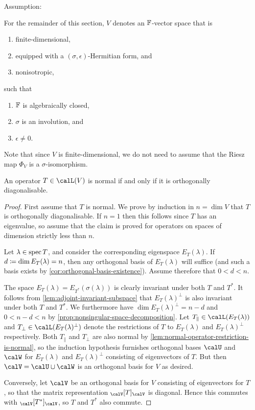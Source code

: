 Assumption:

For the remainder of this section, $V$ denotes an $\mathbb{F}$-vector space that is
%
\begin{enumerate}
    \item finite-dimensional,
    \item equipped with a $(\sigma,\epsilon)$-Hermitian form, and
    \item nonisotropic,
\end{enumerate}
%
such that
%
\begin{enumerate}[resume]
    \item $\mathbb{F}$ is algebraically closed,
    \item $\sigma$ is an involution, and
    \item $\epsilon \neq 0$.
\end{enumerate}

Note that since $V$ is finite-dimensional, we do not need to assume that the Riesz map $\Phi_V$ is a $\sigma$-isomorphism.


\begin{theorem}
    \label{thm:spectral-theorem}
    An operator $T \in \lin(V)$ is normal if and only if it is orthogonally diagonalisable.
\end{theorem}

\begin{proof}
    First assume that $T$ is normal. We prove by induction in $n = \dim V$ that $T$ is orthogonally diagonalisable. If $n = 1$ then this follows since $T$ has an eigenvalue, so assume that the claim is proved for operators on spaces of dimension strictly less than $n$.

    Let $\lambda \in \operatorname{spec} T$, and consider the corresponding eigenspace $E_T(\lambda)$. If $d \coloneqq \dim E_T(\lambda) = n$, then any orthogonal basis of $E_T(\lambda)$ will suffice (and such a basis exists by \cref{cor:orthogonal-basis-existence}). Assume therefore that $0 < d < n$.

    The space $E_T(\lambda) = E_{T^*}(\sigma(\lambda))$ is clearly invariant under both $T$ and $T^*$. It follows from \cref{lem:adjoint-invariant-subspace} that $E_T(\lambda)^\perp$ is also invariant under both $T$ and $T^*$. We furthermore have $\dim E_T(\lambda)^\perp = n-d$ and $0 < n-d < n$ by \cref{prop:nonsingular-space-decomposition}. Let $T_\parallel \in \lin(E_T(\lambda))$ and $T_\perp \in \lin(E_T(\lambda)^\perp)$ denote the restrictions of $T$ to $E_T(\lambda)$ and $E_T(\lambda)^\perp$ respectively. Both $T_\parallel$ and $T_\perp$ are also normal by \cref{lem:normal-operator-restriction-is-normal}, so the induction hypothesis furnishes orthogonal bases $\calU$ and $\calW$ for $E_T(\lambda)$ and $E_T(\lambda)^\perp$ consisting of eigenvectors of $T$. But then $\calV = \calU \union \calW$ is an orthogonal basis for $V$ as desired.

    Conversely, let $\calV$ be an orthogonal basis for $V$ consisting of eigenvectors for $T$, so that the matrix representation $\mr{\calV}{T}{\calV}$ is diagonal. Hence this commutes with $\mr{\calV}{T^*}{\calV}$, so $T$ and $T^*$ also commute.
\end{proof}


